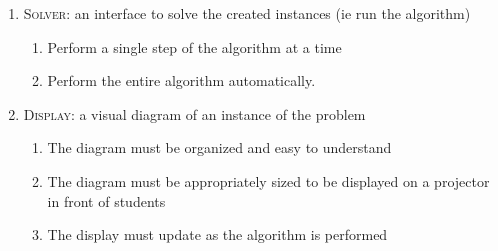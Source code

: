 \begin{enumerate}
\begin{enumerate}
\begin{enumerate}
		\end{enumerate}
		\item \textsc{Solver}: an interface to solve the created instances (ie run the algorithm)
		\begin{enumerate}
			\item Perform a single step of the algorithm at a time
			\item Perform the entire algorithm automatically.
		\end{enumerate}
		\item \textsc{Display}: a visual diagram of an instance of the problem
		\begin{enumerate}
			\item The diagram must be organized and easy to understand
			\item The diagram must be appropriately sized to be displayed
				on a projector in front of students
			\item The display must update as the algorithm is performed
		\end{enumerate}
	\end{enumerate}
\end{enumerate}
